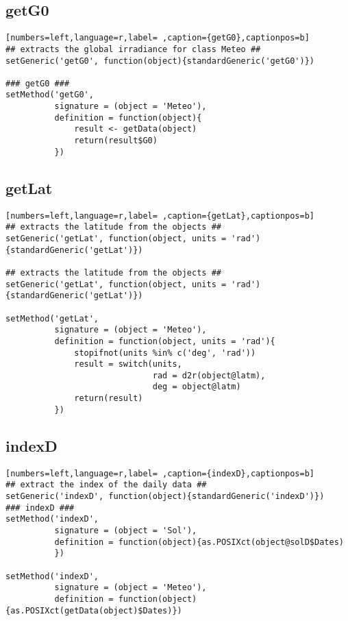 \subsection{getG0}
\label{sec:org74b482b}
\label{subsec:getg0}
\begin{lstlisting}[numbers=left,language=r,label= ,caption={getG0},captionpos=b]
## extracts the global irradiance for class Meteo ##
setGeneric('getG0', function(object){standardGeneric('getG0')})

### getG0 ###
setMethod('getG0',
          signature = (object = 'Meteo'),
          definition = function(object){
              result <- getData(object)
              return(result$G0)
          })
\end{lstlisting}
\subsection{getLat}
\label{sec:org7cc9133}
\label{subsec:getlat}
\begin{lstlisting}[numbers=left,language=r,label= ,caption={getLat},captionpos=b]
## extracts the latitude from the objects ##
setGeneric('getLat', function(object, units = 'rad')
{standardGeneric('getLat')})

## extracts the latitude from the objects ##
setGeneric('getLat', function(object, units = 'rad')
{standardGeneric('getLat')})

setMethod('getLat',
          signature = (object = 'Meteo'),
          definition = function(object, units = 'rad'){
              stopifnot(units %in% c('deg', 'rad'))
              result = switch(units,
                              rad = d2r(object@latm),
                              deg = object@latm)
              return(result)
          })
\end{lstlisting}
\subsection{indexD}
\label{sec:org138a979}
\label{subsec:indexd}
\begin{lstlisting}[numbers=left,language=r,label= ,caption={indexD},captionpos=b]
## extract the index of the daily data ##
setGeneric('indexD', function(object){standardGeneric('indexD')})
### indexD ###
setMethod('indexD',
          signature = (object = 'Sol'),
          definition = function(object){as.POSIXct(object@solD$Dates)
          })

setMethod('indexD',
          signature = (object = 'Meteo'),
          definition = function(object){as.POSIXct(getData(object)$Dates)})
\end{lstlisting}
